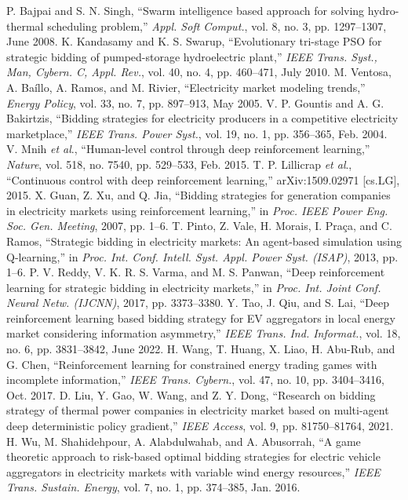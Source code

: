 \documentclass[conference]{IEEEtran}
\begin{document}
\begin{thebibliography}{99}
 P. Bajpai and S. N. Singh, “Swarm intelligence based approach for solving hydro-thermal scheduling problem,” \textit{Appl. Soft Comput.}, vol. 8, no. 3, pp. 1297–1307, June 2008. 
 K. Kandasamy and K. S. Swarup, “Evolutionary tri-stage PSO for strategic bidding of pumped-storage hydroelectric plant,” \textit{IEEE Trans. Syst., Man, Cybern. C, Appl. Rev.}, vol. 40, no. 4, pp. 460–471, July 2010.
 M. Ventosa, A. Baíllo, A. Ramos, and M. Rivier, “Electricity market modeling trends,” \textit{Energy Policy}, vol. 33, no. 7, pp. 897–913, May 2005.
 V. P. Gountis and A. G. Bakirtzis, “Bidding strategies for electricity producers in a competitive electricity marketplace,” \textit{IEEE Trans. Power Syst.}, vol. 19, no. 1, pp. 356–365, Feb. 2004.
 V. Mnih \textit{et al}., “Human-level control through deep reinforcement learning,” \textit{Nature}, vol. 518, no. 7540, pp. 529–533, Feb. 2015.
 T. P. Lillicrap \textit{et al}., “Continuous control with deep reinforcement learning,” arXiv:1509.02971 [cs.LG], 2015.
 X. Guan, Z. Xu, and Q. Jia, “Bidding strategies for generation companies in electricity markets using reinforcement learning,” in \textit{Proc. IEEE Power Eng. Soc. Gen. Meeting}, 2007, pp. 1–6. 
 T. Pinto, Z. Vale, H. Morais, I. Praça, and C. Ramos, “Strategic bidding in electricity markets: An agent-based simulation using Q-learning,” in \textit{Proc. Int. Conf. Intell. Syst. Appl. Power Syst. (ISAP)}, 2013, pp. 1–6. 
 P. V. Reddy, V. K. R. S. Varma, and M. S. Panwan, “Deep reinforcement learning for strategic bidding in electricity markets,” in \textit{Proc. Int. Joint Conf. Neural Netw. (IJCNN)}, 2017, pp. 3373–3380. 
 Y. Tao, J. Qiu, and S. Lai, “Deep reinforcement learning based bidding strategy for EV aggregators in local energy market considering information asymmetry,” \textit{IEEE Trans. Ind. Informat.}, vol. 18, no. 6, pp. 3831–3842, June 2022.
 H. Wang, T. Huang, X. Liao, H. Abu-Rub, and G. Chen, “Reinforcement learning for constrained energy trading games with incomplete information,” \textit{IEEE Trans. Cybern.}, vol. 47, no. 10, pp. 3404–3416, Oct. 2017.
 D. Liu, Y. Gao, W. Wang, and Z. Y. Dong, “Research on bidding strategy of thermal power companies in electricity market based on multi-agent deep deterministic policy gradient,” \textit{IEEE Access}, vol. 9, pp. 81750–81764, 2021.
 H. Wu, M. Shahidehpour, A. Alabdulwahab, and A. Abusorrah, “A game theoretic approach to risk-based optimal bidding strategies for electric vehicle aggregators in electricity markets with variable wind energy resources,” \textit{IEEE Trans. Sustain. Energy}, vol. 7, no. 1, pp. 374–385, Jan. 2016.

\end{thebibliography}
\end{document}
